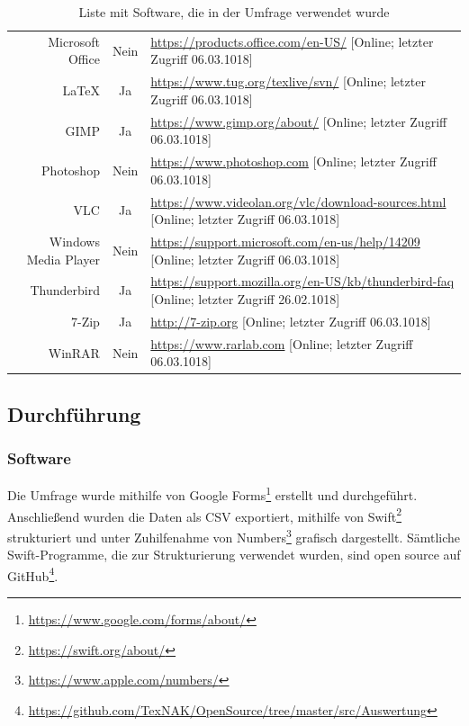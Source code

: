 \documentclass[a4paper]{article}
\begin{document}
\begin{table}[!htbp]
\begin{tabularx}{\textwidth}{rcX}
			               Microsoft Office & Nein & \tiny\url{https://products.office.com/en-US/} [Online; letzter Zugriff 06.03.1018]\\
			               LaTeX & Ja & \tiny\url{https://www.tug.org/texlive/svn/} [Online; letzter Zugriff 06.03.1018] \\
			               GIMP & Ja & \tiny\url{https://www.gimp.org/about/} [Online; letzter Zugriff 06.03.1018]\\
			               Photoshop & Nein & \tiny\url{https://www.photoshop.com} [Online; letzter Zugriff 06.03.1018]\\
			               VLC & Ja & \tiny\url{https://www.videolan.org/vlc/download-sources.html} [Online; letzter Zugriff 06.03.1018]\\
			               Windows Media Player & Nein & \tiny\url{https://support.microsoft.com/en-us/help/14209} [Online; letzter Zugriff 06.03.1018]\\
			               Thunderbird & Ja & \tiny\url{https://support.mozilla.org/en-US/kb/thunderbird-faq} [Online; letzter Zugriff 26.02.1018] \\
			               7-Zip & Ja & \tiny\url{http://7-zip.org} [Online; letzter Zugriff 06.03.1018]\\
			               WinRAR & Nein & \tiny\url{https://www.rarlab.com} [Online; letzter Zugriff 06.03.1018]
			         \end{tabularx}
			         \caption{Liste mit Software, die in der Umfrage verwendet wurde}
			         \label{table:software_examples}
			     \end{table}
			     
		\subsection{Durchführung}
            \subsubsection{Software}
                Die Umfrage wurde mithilfe von Google Forms\footnote{\url{https://www.google.com/forms/about/}} erstellt und durchgeführt. Anschließend wurden die Daten als CSV exportiert, mithilfe von Swift\footnote{\url{https://swift.org/about/}} strukturiert und unter Zuhilfenahme von Numbers\footnote{\url{https://www.apple.com/numbers/}} grafisch dargestellt. Sämtliche Swift-Programme, die zur Strukturierung verwendet wurden, sind open source auf GitHub\footnote{\url{https://github.com/TexNAK/OpenSource/tree/master/src/Auswertung}}.
\end{document}
